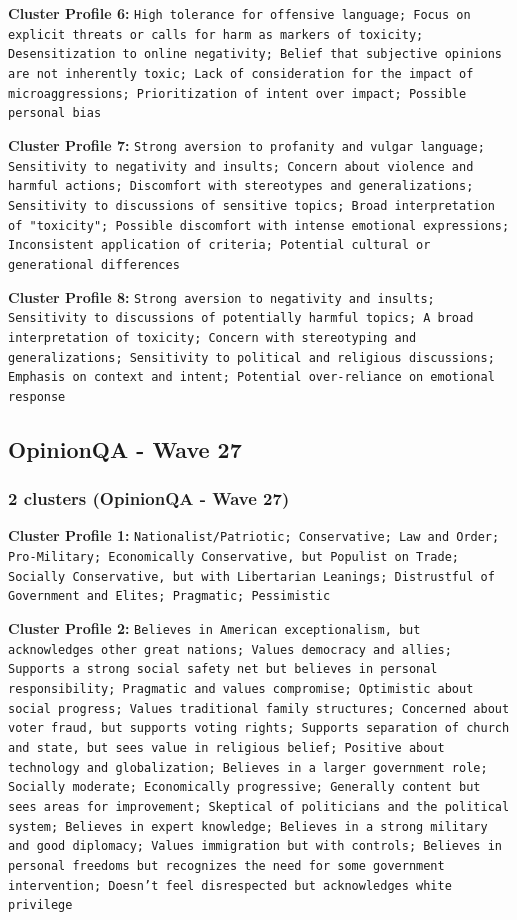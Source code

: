 \documentclass[11pt]{article}
\begin{document}
\textbf{Cluster Profile 6:} \texttt{High tolerance for offensive language; Focus on explicit threats or calls for harm as markers of toxicity; Desensitization to online negativity; Belief that subjective opinions are not inherently toxic; Lack of consideration for the impact of microaggressions; Prioritization of intent over impact; Possible personal bias}

\textbf{Cluster Profile 7:} \texttt{Strong aversion to profanity and vulgar language; Sensitivity to negativity and insults; Concern about violence and harmful actions; Discomfort with stereotypes and generalizations; Sensitivity to discussions of sensitive topics; Broad interpretation of "toxicity"; Possible discomfort with intense emotional expressions; Inconsistent application of criteria; Potential cultural or generational differences}

\textbf{Cluster Profile 8:} \texttt{Strong aversion to negativity and insults; Sensitivity to discussions of potentially harmful topics; A broad interpretation of toxicity; Concern with stereotyping and generalizations; Sensitivity to political and religious discussions; Emphasis on context and intent; Potential over-reliance on emotional response}


\subsection{OpinionQA - Wave 27}

\subsubsection{2 clusters (OpinionQA - Wave 27)}

\textbf{Cluster Profile 1:} \texttt{Nationalist/Patriotic; Conservative; Law and Order; Pro-Military; Economically Conservative, but Populist on Trade; Socially Conservative, but with Libertarian Leanings; Distrustful of Government and Elites; Pragmatic; Pessimistic}

\textbf{Cluster Profile 2:} \texttt{Believes in American exceptionalism, but acknowledges other great nations; Values democracy and allies; Supports a strong social safety net but believes in personal responsibility; Pragmatic and values compromise; Optimistic about social progress; Values traditional family structures; Concerned about voter fraud, but supports voting rights; Supports separation of church and state, but sees value in religious belief; Positive about technology and globalization; Believes in a larger government role; Socially moderate; Economically progressive; Generally content but sees areas for improvement; Skeptical of politicians and the political system; Believes in expert knowledge; Believes in a strong military and good diplomacy; Values immigration but with controls; Believes in personal freedoms but recognizes the need for some government intervention; Doesn't feel disrespected but acknowledges white privilege}
\end{document}

